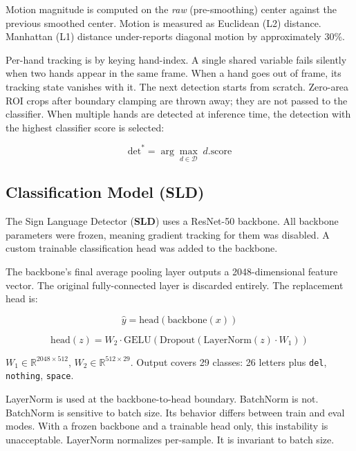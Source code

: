 Motion magnitude is computed on the \emph{raw} (pre-smoothing) center against the previous smoothed center. 
Motion is measured as Euclidean (L2) distance. Manhattan (L1) distance under-reports diagonal motion by approximately 30\%.

Per-hand tracking is by keying hand-index. 
A single shared variable fails silently when two hands appear in the same frame. When a hand goes out of frame, 
its tracking state vanishes with it. 
The next detection starts from scratch. Zero-area ROI crops after boundary clamping are thrown away; 
they are not 
passed to the classifier.
When multiple hands are detected at inference time, 
the detection with the highest classifier score is selected:

\begin{equation}
    \text{det}^* = \arg\max_{d \in \mathcal{D}}\; d.\text{score}
\end{equation}

\subsection{Classification Model (SLD)}

The Sign Language Detector (\textbf{SLD}) uses a ResNet-50 backbone. 
All backbone parameters were frozen, meaning gradient tracking for them
was disabled. A custom trainable classification head was added to the backbone.

The backbone's final average pooling layer outputs a 2048-dimensional feature vector. 
The original fully-connected layer is discarded entirely. The replacement head is:

\begin{equation}
    \hat{y} = \text{head}(\text{backbone}(x))
\end{equation}

\begin{equation}
    \text{head}(z) = W_2 \cdot \text{GELU}(\text{Dropout}(\text{LayerNorm}(z) \cdot W_1))
\end{equation}

$W_1 \in \mathbb{R}^{2048 \times 512}$, $W_2 \in \mathbb{R}^{512 \times 29}$. Output covers 29 classes: 26 letters plus \texttt{del}, \texttt{nothing}, \texttt{space}.

LayerNorm is used at the backbone-to-head boundary. BatchNorm is not. BatchNorm is sensitive to batch size. Its behavior differs between train and eval modes. With a frozen backbone and a trainable head only, this instability is unacceptable. LayerNorm normalizes per-sample. It is invariant to batch size.

